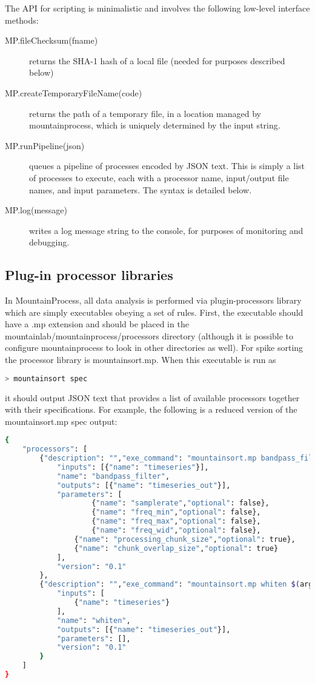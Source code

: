 \documentclass{article}
\begin{document}
The API for scripting is minimalistic and involves the following low-level interface methods:
\begin{description}
\item[MP.fileChecksum(fname)] returns the SHA-1 hash of a local file (needed for purposes described below)
\item[MP.createTemporaryFileName(code)] returns the path of a temporary file, in a location managed by mountainprocess, which is uniquely determined by the input string.
\item[MP.runPipeline(json)] queues a pipeline of processes encoded by JSON text. This is simply a list of processes to execute, each with a processor name, input/output file names, and input parameters. The syntax is detailed below.
\item[MP.log(message)] writes a log message string to the console, for purposes of monitoring and debugging.

\end{description}

\subsection{Plug-in processor libraries}

In MountainProcess, all data analysis is performed via plugin-processors library which are simply executables obeying a set of rules. First, the executable should have a .mp extension and should be placed in the mountainlab/mountainprocess/processors directory (although it is possible to configure mountainprocess to look in other directories as well). For spike sorting the processor library is mountainsort.mp. When this executable is run as
\begin{lstlisting}[language=bash]
> mountainsort spec
\end{lstlisting}
it should output JSON text that provides a list of available processors together with their specifications. For example, the following is a reduced version of the mountainsort.mp spec output:
\begin{lstlisting}[language=bash]
{
    "processors": [
        {"description": "","exe_command": "mountainsort.mp bandpass_filter $(arguments)",
            "inputs": [{"name": "timeseries"}],
            "name": "bandpass_filter",
            "outputs": [{"name": "timeseries_out"}],
            "parameters": [
                    {"name": "samplerate","optional": false},
                    {"name": "freq_min","optional": false},
                    {"name": "freq_max","optional": false},
                    {"name": "freq_wid","optional": false},
                {"name": "processing_chunk_size","optional": true},
                {"name": "chunk_overlap_size","optional": true}
            ],
            "version": "0.1"
        },
        {"description": "","exe_command": "mountainsort.mp whiten $(arguments)",
            "inputs": [
                {"name": "timeseries"}
            ],
            "name": "whiten",
            "outputs": [{"name": "timeseries_out"}],
            "parameters": [],
            "version": "0.1"
        }
    ]
}
\end{lstlisting}
\end{document}
